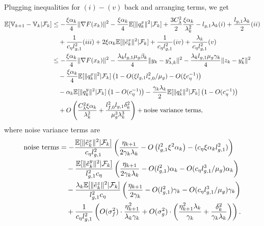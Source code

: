 Plugging inequalities for $(i)-(v)$ back and arranging terms, we get
\begin{align*}
    \mathbb{E}[ \mathbb{V}_{k+1} - \mathbb{V}_k | \mathcal{F}_k] &\le -\frac{\xi \alpha_k}{4} \|\nabla F(x_k)\|^2 - \frac{\xi \alpha_k}{4} \mathbb{E}[\|q_k^x\|^2| \mathcal{F}_k] + \frac{3 C_{\lambda}^2}{2} \frac{\xi \alpha_k}{\lambda_k^2} - l_{g,1}\lambda_k (i) + \frac{l_{g,1} \lambda_k}{2} (ii) \\
    &\quad + \frac{1}{c_\eta l_{g,1}^2} (iii) + 2\xi \alpha_k \mathbb{E}[\|\tilde{e}_k^x\|^2 | \mathcal{F}_k] + \frac{1}{c_{\eta} l_{g,1}^2} (iv) + \frac{\lambda_k}{c_\eta l_{g,1}^2} (v) \\
    &\le -\frac{\xi \alpha_k}{4} \|\nabla F(x_k)\|^2 - \frac{\lambda_k l_{g,1} \mu_g \beta_k}{4} \|y_k - y_{\lambda,k}^*\|^2 - \frac{\lambda_k l_{g,1} \mu_g \gamma_k}{4}\|z_k - y_k^*\|^2 \\
    &\quad - \frac{\xi \alpha_k}{4} \mathbb{E}[\|q_k^x\|^2 | \mathcal{F}_k] \left(1 - O(\xi l_{g,1} l_{*,0}^2 / 
    \mu_g) - O(\xi c_{\eta}^{-1}) \right) \\
    &\quad - \alpha_k \mathbb{E}[\|q_k^y\|^2 |\mathcal{F}_k] \left(1 - O(c_{\eta}^{-1}) \right) - \frac{\gamma_k \lambda_k}{2} \mathbb{E}[\|q_k^z\|^2 |\mathcal{F}_k] \left(1 - O(c_{\eta}^{-1}) \right) \\
    &\quad + O\left( \frac{C_\lambda^2 \xi \alpha_k}{\lambda_k^2} + \frac{l_{f,0}^2 l_{g,1} \delta_k^2}{\mu_g^3 \lambda_k^3} \right) + \text{noise variance terms},
\end{align*}
where noise variance terms are
\begin{align*}
    \text{noise terms} &= -\frac{\mathbb{E}[\|\tilde{e}_k^x\|^2 | \mathcal{F}_k]}{c_{\eta} l_{g,1}^2} \left( \frac{\eta_{k+1}}{2\gamma_k\lambda_k} - O\left(l_{g,1}^2 \xi^2 \alpha_k \right) - (c_\eta \xi \alpha_k l_{g,1}^2) \right) \\
    &\quad - \frac{\mathbb{E}[\|\tilde{e}_k^y\|^2 | \mathcal{F}_k]}{l_{g,1}^2 c_{\eta}} \left( \frac{\eta_{k+1}}{2\gamma_k \lambda_k} - O(l_{g,1}^2) \alpha_k - O(c_\eta l_{g,1}^3 / \mu_g) \alpha_k \right) \\
    &\quad - \frac{\lambda_k \mathbb{E}[\|\tilde{e}_k^z\|^2 | \mathcal{F}_k]}{l_{g,1}^2 c_{\eta}} \left( \frac{\eta_{k+1}}{2\gamma_k} - O(l_{g,1}^2) \gamma_k - O(c_\eta l_{g,1}^3 / \mu_g) \gamma_k \right) \\
    &\quad + \frac{1}{c_\eta l_{g,1}^2} 
    \left( O(\sigma_f^2) \cdot \frac{\eta_{k+1}^2}{\lambda_k \gamma_k} + O(\sigma_g^2) \cdot \left( \frac{\eta_{k+1}^2 \lambda_k}{\gamma_k} + \frac{\delta_k^2}{\gamma_k \lambda_k} \right) \right). 
\end{align*}
